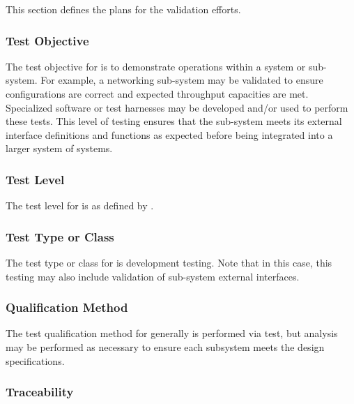


This section defines the plans for the \TestIdNameX validation efforts.

\subsubsection{Test Objective}
\label{loc:TestObjective\TestIdName}

The test objective for \TestIdNameX is to demonstrate operations within a system or sub-system.
For example, a networking sub-system may be validated to ensure configurations are correct and expected throughput capacities are met.
Specialized software or test harnesses may be developed and/or used to perform these tests.
This level of testing ensures that the sub-system meets its external interface definitions and functions as expected before being integrated into a larger system of systems.

\subsubsection{Test Level}
\label{loc:TestLevels\TestIdName}

The test level for \TestIdNameX is \StageFour as defined by \citeStageTestingSTD.

\subsubsection{Test Type or Class}
\label{loc:TestType\TestIdName}

The test type or class for \TestIdNameX is development testing.
Note that in this case, this testing may also include validation of sub-system external interfaces.

\subsubsection{Qualification Method}
\label{loc:TestQualificationMethod\TestIdName}

The test qualification method for \TestIdNameX generally is performed via test, but analysis may be performed as necessary to ensure each subsystem meets the design specifications.

\subsubsection{Traceability}
\label{loc:TestTraceability\TestIdName}

